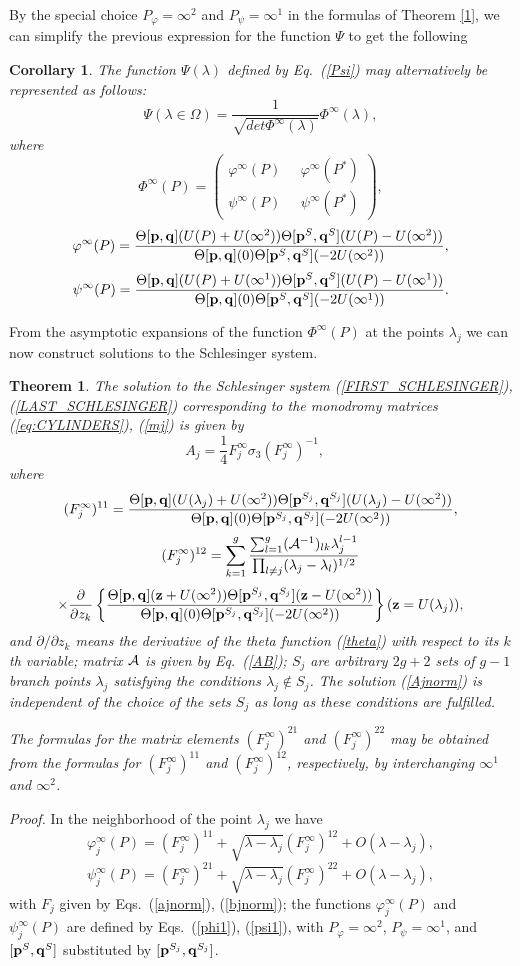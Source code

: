 \documentclass[11pt]{article}
\newtheorem{theorem}{Theorem}[section]
\newtheorem{corollary}{Corollary}[section]
\def\be{\begin{equation}}
\def\ee{\end{equation}}
\def\ben{\begin{displaymath}}
\def\een{\end{displaymath}}
\def\ba{\begin{array}}
\def\ea{\end{array}}
\def\l{\lambda}
\def\ph{\phi}
\def\Th{\Theta}
\def\ph{\phi^{\infty}}
\def\psih{\psi^{\infty}}
\def\phi{\varphi}
\def\la{\label}
\def\f{\frac}
\def\p{\partial}
\def\pb{{\bf p}}
\def\qb{{\bf q}}
\def\0{S}
\def\j{{S_j}}
\begin{document}
By the special choice   $P_\phi =\infty^2$ and  $P_\psi =\infty^1$ in the formulas of Theorem \ref{1}, we can simplify the previous expression for the function $\Psi$ to get the following
\begin{corollary}
The function $\Psi(\l)$ defined by Eq.~{\rm(\ref{Psi})} may alternatively be represented as follows:
\be
\Psi(\l\in\Omega)=\f{1}{\sqrt{det \Phi^\infty(\l)}}\Phi^\infty(\l),
\la{Psih}\ee
where
\be
\Phi^\infty(P)=\left(\ba{cc}\ph(P)\;\;\;\;\; \ph(P^*)\\
                  \psih(P)\;\;\;\;\; \psih(P^*)\ea\right),
\la{Psih0}
\ee 
\be
\ph(P) = \f{\Th[\pb,\qb](U(P)+U(\infty^2))\Th[\pb^\0,\qb^\0](U(P)-U(\infty^2))}
{\Th[\pb,\qb](0)\Th[\pb^\0,\qb^\0](-2U(\infty^2))},
\la{phinorm}
\ee
\be
\psih(P) = \f{\Th[\pb,\qb](U(P)+U(\infty^1))\Th[\pb^\0,\qb^\0](U(P)-U(\infty^1))}
{\Th[\pb,\qb](0)\Th[\pb^\0,\qb^\0](-2U(\infty^1))}.
\la{psinorm}
\ee
\end{corollary}
{}From the asymptotic expansions of the function $\Phi^\infty(P)$ at the points $\l_j$ we can now construct solutions to the Schlesinger system.
\begin{theorem}
The solution to the Schlesinger system {\rm(\ref{FIRST_SCHLESINGER})}, {\rm(\ref{LAST_SCHLESINGER})} corresponding to the monodromy matrices {\rm(\ref{eq:CYLINDERS})}, {(\rm\ref{mj})} is given by
\be
A_j=\f{1}{4}F_j^{\infty}\sigma_3 (F_j^{\infty})^{-1},\;\;\;
\la{Ajnorm}
\ee
where
\be
(F_j^{\infty})^{11}= \f{\Th[\pb,\qb](U(\l_j)+U(\infty^2))
\Th[\pb^\j,\qb^\j](U(\l_j)-U(\infty^2))}
{\Th[\pb,\qb](0)\Th[\pb^\j,\qb^\j](-2U(\infty^2))},
\la{ajnorm}\ee
\ben
(F_j^{\infty})^{12}= \sum_{k=1}^g \f{\sum_{l=1}^g ({\cal A}^{-1})_{lk} \l_j^{l-1}}{\prod_{l\neq j} (\l_j-\l_l)^{1/2}}
\een
\be
\times\f{\p}{\p z_k}\left\{\f{\Th[\pb,\qb]({\bf z}+U(\infty^2))
\Th[\pb^\j,\qb^\j]({\bf z}-U(\infty^2))}{\Th[\pb,\qb](0)\Th[\pb^\j,\qb^\j](-2U(\infty^2))}\right\}({\bf z}=U(\l_j)),
\la{bjnorm}\ee
and  
$\p/\p z_k$ means the derivative of the theta function {\rm(\ref{theta})} with respect to its $k$th variable; matrix ${\cal A}$ is given by Eq.~{\rm(\ref{AB})}; $\j$ are arbitrary $2g+2$ sets of $g-1$ branch points $\l_j$ satisfying the conditions $\l_j\not\in \j$. The solution {\rm(\ref{Ajnorm})} is independent of the choice of the sets $S_j$ as long as these conditions are fulfilled.

The formulas for the matrix elements $(F_j^{\infty})^{21}$ and $(F_j^{\infty})^{22}$ may be obtained from the formulas for $(F_j^{\infty})^{11}$ and $(F_j^{\infty})^{12}$, respectively, by interchanging $\infty^1$ and $\infty^2$.
\la{Schlesinger}
\end{theorem}
{\it Proof.}
In the neighborhood of the point $\l_j$ we have
\be
\ph_j(P)= (F_j^{\infty})^{11}+\sqrt{\l-\l_j}(F_j^{\infty})^{12}+O(\l-\l_j),
\la{asPh}
\ee
\be
\psih_j(P)= (F_j^{\infty})^{21}+\sqrt{\l-\l_j}(F_j^{\infty})^{22}+O(\l-\l_j),
\la{asPsih}
\ee
with $F_j$ given by Eqs.~(\ref{ajnorm}), (\ref{bjnorm}); the functions $\ph_j(P)$ and $\psih_j(P)$ are defined by Eqs.~(\ref{phi1}), (\ref{psi1}), with $P_\phi =\infty^2$, $P_\psi =\infty^1$, and $[\pb^\0,\qb^\0]$ substituted by $[\pb^\j,\qb^\j]$.
\end{document}
